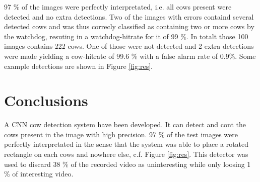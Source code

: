 \documentclass[10pt,a4paper,twocolumn]{article}
\begin{document}
97 \% of the images were perfectly interpretated, i.e. all cows present were detected and no extra detections. Two of the images with errors containd several detected cows and was thus correcly classified as containing two or more cows by the watchdog, resuting in a watchdog-hitrate for it of 99 \%. In totalt those 100 images contains 222 cows. One of those were not detected and 2 extra detections were made yielding a cow-hitrate of 99.6 \% with a false alarm rate of 0.9\%. Some example detections are shown in Figure \ref{fig:res}.

\section{Conclusions}

A CNN cow detection system have been developed. It can detect and cont the cows present in the image with high precision. 97 \% of the test images were perfectly interpretated in the sense that the system was able to place a rotated rectangle on each cows and nowhere else, c.f. Figure \ref{fig:res}. This detector was used to discard 38 \% of the recorded video as uninteresting while only loosing 1 \% of interesting video.



\end{document}
